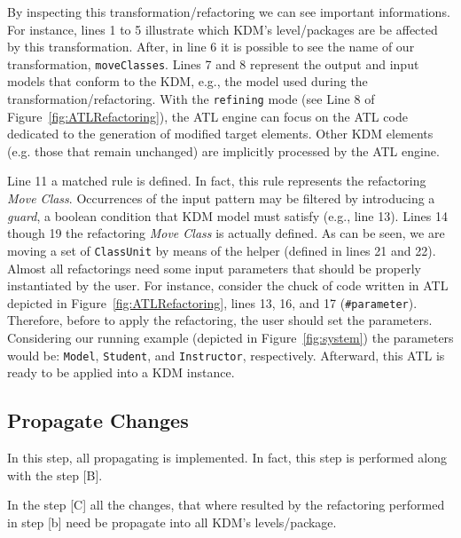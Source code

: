 By inspecting this transformation/refactoring we can see important informations. For instance, lines 1 to 5 illustrate which KDM's level/packages are be affected by this transformation.  After, in line 6 it is possible to see the name of our transformation, \texttt{moveClasses}. Lines 7 and 8 represent the output and input models that conform to the KDM, e.g., the model used during the transformation/refactoring. 
%
With the \texttt{refining} mode (see Line 8 of Figure~\ref{fig:ATLRefactoring}), the ATL engine can focus on the ATL code dedicated to the generation of modified target elements. Other KDM elements (e.g. those that remain unchanged) are implicitly processed by the ATL engine.


Line 11 a matched rule is defined. In fact, this rule represents the refactoring \textit{Move Class}. Occurrences of the input pattern may be filtered by introducing a \textit{guard}, a boolean condition that KDM model must satisfy (e.g., line 13). Lines 14 though 19 the refactoring \textit{Move Class} is actually defined. As can be seen, we are moving a set of \texttt{ClassUnit} by means of the helper (defined in lines 21 and 22). 
Almost all refactorings need some input parameters that should be properly instantiated by the user. For instance, consider the chuck of code written in ATL depicted in Figure~\ref{fig:ATLRefactoring}, lines 13, 16, and 17 (\texttt{\#parameter}). Therefore, before to apply the refactoring, the user should set the parameters. Considering our running example (depicted in Figure~\ref{fig:system}) the parameters would be: \texttt{Model}, \texttt{Student}, and \texttt{Instructor}, respectively. Afterward, this ATL is ready to be applied into a KDM instance.




\subsection{Propagate Changes} %
\label{sub:apply_refactoring}

In this step, all propagating is implemented. In fact, this step is performed along with the step [B].

In the step [C] all the changes, that where resulted by the refactoring  performed in step [b] need be propagate into all KDM's levels/package.  



